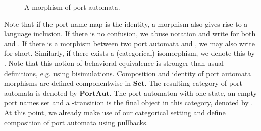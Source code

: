 \documentclass[copyright,creativecommons]{eptcs}
\newcommand{\Set}{\ensuremath{\mathbf{Set}}}
\newcommand{\PA}{\ensuremath{\mathbf{PortAut}}}
\newcommand{\tl}[1]{\scriptsize{\ensuremath{\mathsf{#1}}}}
\begin{document}
\vfill

\begin{figure}[h]
	\begin{center}
	


 	\end{center}
\caption{A morphism of port automata.}
\label{fig:automata-morphism}
\end{figure}

\vfill

Note that if the port name map  is the identity, a morphism also gives
rise to a language inclusion. If there is no confusion, we abuse notation and
write  for both  and .
If there is a morphism between two port automata  and , we
may also write  for short.
Similarly, if there exists a (categorical) isomorphism, we denote
this by . Note that this notion of behavioral equivalence is
stronger than usual definitions, e.g. using bisimulations.
\vfill
Composition and identity of port automata morphisms are defined
componentwise in \Set. The resulting category of port automata is denoted by
{\PA}. The port automaton with one state, an empty port names set and
a -transition is the final object in this category, denoted by .
At this point, we already make use of our categorical setting
and define composition of port automata using pullbacks.
\end{document}
